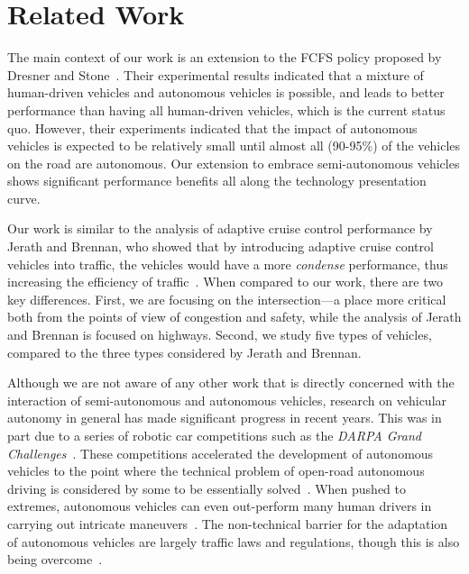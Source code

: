 \section{Related Work}
\label{sec:related}

The main context of our work is an extension to the FCFS policy
proposed by Dresner and Stone~\cite{bib:Dresner08Multiagent}. Their
experimental results indicated that a mixture of human-driven vehicles
and autonomous vehicles is possible, and leads to better performance
than having all human-driven vehicles, which is the current status
quo.  However, their experiments indicated that the impact of
autonomous vehicles is expected to be relatively small until almost all (90-95\%) of
the vehicles on the road are autonomous.  Our extension to embrace
semi-autonomous vehicles shows significant performance benefits all
along the technology presentation curve.

Our work is similar to the analysis of adaptive cruise control
performance by Jerath and Brennan, who showed that by introducing
adaptive cruise control vehicles into traffic, the vehicles would have
a more \textit{condense} performance, thus increasing the efficiency
of traffic~\cite{bib:Jerath10adaptive}.  When compared to our work,
there are two key differences.  First, we are focusing on the
intersection---a place more critical both from the points of view of
congestion and safety, while the analysis of Jerath and Brennan is
focused on highways.  Second, we study five types of vehicles,
compared to the three types considered by Jerath and Brennan.

Although we are not aware of any other work that is directly concerned
with the interaction of semi-autonomous and autonomous vehicles,
research on vehicular autonomy in general has made significant
progress in recent years.  This was in part due to a series of robotic
car competitions such as the \emph{DARPA Grand
Challenges}~\cite{DARPAGrandChallenge}.  These competitions
accelerated the development of autonomous vehicles to the point where
the technical problem of open-road autonomous driving is considered by
some to be essentially solved~\cite{bib:Dresner08Multiagent}.  When pushed to
extremes, autonomous vehicles can even out-perform many human drivers
in carrying out intricate maneuvers~\cite{Squatriglia2010}. The
non-technical barrier for the adaptation of autonomous vehicles are
largely traffic laws and regulations, though this is also being
overcome~\cite{calo2011-nevada}.

